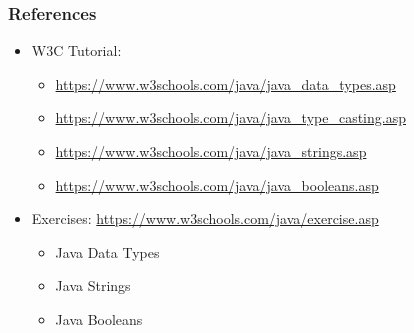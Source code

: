 \documentclass{beamer}
\begin{document}
	\begin{frame}
		\frametitle{References}
		\begin{itemize}
			\item W3C Tutorial: 
			\begin{itemize}
				\item \url{https://www.w3schools.com/java/java\_data\_types.asp}
				\item \url{https://www.w3schools.com/java/java\_type\_casting.asp}
				\item \url{https://www.w3schools.com/java/java\_strings.asp}
				\item \url{https://www.w3schools.com/java/java_booleans.asp}
			\end{itemize}
			\item Exercises: \url{https://www.w3schools.com/java/exercise.asp}
			\begin{itemize}
				\item Java Data Types
				\item Java Strings
				\item Java Booleans
			\end{itemize}
		\end{itemize}
	\end{frame}
\end{document}
